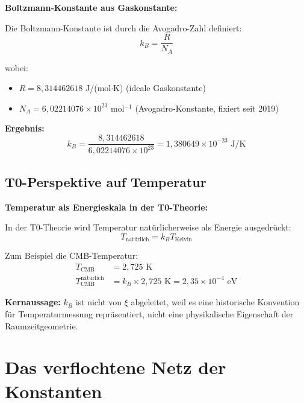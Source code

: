 	\begin{keyresult}
		\textbf{Boltzmann-Konstante aus Gaskonstante:}
		
		Die Boltzmann-Konstante ist durch die Avogadro-Zahl definiert:
		\begin{equation}
			k_B = \frac{R}{N_A}
		\end{equation}
		
		wobei:
		\begin{itemize}
			\item $R = 8{,}314462618$ J/(mol$\cdot$K) (ideale Gaskonstante)
			\item $N_A = 6{,}02214076 \times 10^{23}$ mol$^{-1}$ (Avogadro-Konstante, fixiert seit 2019)
		\end{itemize}
		
		\textbf{Ergebnis:}
		\begin{equation}
			k_B = \frac{8{,}314462618}{6{,}02214076 \times 10^{23}} = 1{,}380649 \times 10^{-23} \text{ J/K}
		\end{equation}
	\end{keyresult}
	
	\subsection{T0-Perspektive auf Temperatur}
	
	\begin{insight}
		\textbf{Temperatur als Energieskala in der T0-Theorie:}
		
		In der T0-Theorie wird Temperatur natürlicherweise als Energie ausgedrückt:
		\begin{equation}
			T_{\text{natürlich}} = k_B T_{\text{Kelvin}}
		\end{equation}
		
		Zum Beispiel die CMB-Temperatur:
		\begin{align}
			T_{\text{CMB}} &= 2{,}725 \text{ K} \\
			T_{\text{CMB}}^{\text{natürlich}} &= k_B \times 2{,}725 \text{ K} = 2{,}35 \times 10^{-4} \text{ eV}
		\end{align}
		
		\textbf{Kernaussage:} $k_B$ ist nicht von $\xi$ abgeleitet, weil es eine historische Konvention für Temperaturmessung repräsentiert, nicht eine physikalische Eigenschaft der Raumzeitgeometrie.
	\end{insight}
	
	\section{Das verflochtene Netz der Konstanten}
	
